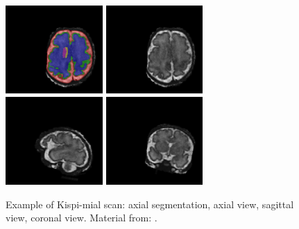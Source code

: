 \begin{figure}[htbp]
    \centering
    \includegraphics[width=0.33\textwidth]{figures/mial_ax_dseg.png}
    \hspace{5pt}
    \includegraphics[width=0.33\textwidth]{figures/mial_ax.png} \\
    \vspace{10pt}
    \includegraphics[width=0.33\textwidth]{figures/mial_sag.png}
    \hspace{5pt}
    \includegraphics[width=0.33\textwidth]{figures/mial_cor.png}
    \caption{Example of Kispi-mial scan: axial segmentation, axial view, sagittal view, coronal view. Material from: \cite{Payette2021, FeTA_MICCAI}.}
    \label{fig:kispi-mial_images}
\end{figure}
